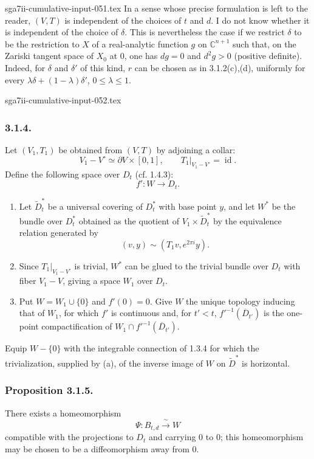 \begin{filecontents*}{sga7ii-cumulative-input-051.tex}
In a sense whose precise formulation is left to the reader, $(V,T)$
is independent of the choices of $t$ and $d$.  I do not know whether
it is independent of the choice of $\delta$.  This is nevertheless
the case if we restrict $\delta$ to be the restriction to $X$ of a
real-analytic function $g$ on $\mathbb C^{n+1}$ such that, on the
Zariski tangent space of $X_0$ at $0$, one has $dg=0$ and $d^2g>0$
(positive definite).  Indeed, for $\delta$ and $\delta'$ of this
kind, $r$ can be chosen as in 3.1.2(c),(d), uniformly for every
$\lambda\delta+(1-\lambda)\delta'$, $0\leq\lambda\leq1$.

\end{filecontents*}
\begin{filecontents*}{sga7ii-cumulative-input-052.tex}
\subsubsection*{3.1.4.}
Let $(V_1,T_1)$ be obtained from $(V,T)$ by adjoining a collar:
\[
V_1-V^\circ\simeq\partial V\times[0,1],
\qquad
T_1|_{V_1-V^\circ}=\operatorname{id}.
\]
Define the following space over $D_t$ (cf. 1.4.3):
\[
f':W\longrightarrow D_t.
\]

\begin{enumerate}[label=(\alph*)]
\item Let $\widetilde D_t^*$ be a universal covering of $D_t^*$ with
  base point $y$, and let $W^*$ be the bundle over $D_t^*$ obtained as
  the quotient of $V_1\times\widetilde D_t^*$ by the equivalence
  relation generated by
  \[
  (v,y)\sim(T_1v,e^{2\pi i}y).
  \]
\item Since $T_1|_{V_1-V^\circ}$ is trivial, $W^*$ can be glued to
  the trivial bundle over $D_t$ with fiber $V_1-V$, giving a space
  $W_1$ over $D_t$.
\item Put $W=W_1\cup\{0\}$ and $f'(0)=0$.  Give $W$ the unique
  topology inducing that of $W_1$, for which $f'$ is continuous and,
  for $t'<t$, ${f'}^{-1}(\overline D_{t'})$ is the one-point
  compactification of
  $W_1\cap {f'}^{-1}(\overline D_{t'})$.
\end{enumerate}

Equip $W-\{0\}$ with the integrable connection of 1.3.4 for which
the trivialization, supplied by (a), of the inverse image of $W$ on
$\widetilde D^*$ is horizontal.

\subsubsection*{Proposition 3.1.5.}
There exists a homeomorphism
\[
\Psi:B_{t,d}\xrightarrow{\ \sim\ }W
\]
compatible with the projections to $D_t$ and carrying $0$ to $0$;
this homeomorphism may be chosen to be a diffeomorphism away from
$0$.


\end{filecontents*}

